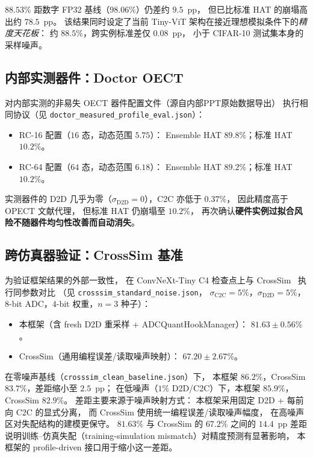 $88.53\%$ 距数字 FP32 基线（$98.06\%$）仍差约 $9.5$~pp，
但已比标准 HAT 的崩塌高出约 $78.5$~pp。
该结果同时设定了当前 Tiny-ViT 架构在接近理想模拟条件下的\emph{精度天花板}：
约 $88.5\%$，跨实例标准差仅 $0.08$~pp，
小于 CIFAR-10 测试集本身的采样噪声。

\subsection{内部实测器件：Doctor OECT}

对内部实测的非易失 OECT 器件配置文件（源自内部PPT原始数据导出）
执行相同协议（见 \texttt{doctor\_measured\_profile\_eval.json}）：
\begin{itemize}
    \item RC-16 配置（$16$ 态，动态范围 $5.75$）：
    Ensemble HAT $89.8\%$；标准 HAT $10.2\%$。
    \item RC-64 配置（$64$ 态，动态范围 $6.18$）：
    Ensemble HAT $89.2\%$；标准 HAT $10.2\%$。
\end{itemize}

实测器件的 D2D 几乎为零（$\sigma_{\mathrm{D2D}}=0$），C2C 亦低于 $0.37\%$，
因此精度高于 OPECT 文献代理，
但标准 HAT 仍崩塌至 $10.2\%$，
再次确认\textbf{硬件实例过拟合风险不随器件均匀性改善而自动消失}。

\subsection{跨仿真器验证：CrossSim 基准}

为验证框架结果的外部一致性，
在 ConvNeXt-Tiny C4 检查点上与 CrossSim~\citep{crosssim2026} 执行同参数对比
（见 \texttt{crosssim\_standard\_noise.json}，
$\sigma_{\mathrm{C2C}}=5\%$，$\sigma_{\mathrm{D2D}}=5\%$，8-bit ADC，4-bit 权重，$n=3$ 种子）：
\begin{itemize}
    \item 本框架（含 fresh D2D 重采样 + ADCQuantHookManager）：
    $\mathbf{81.63\pm0.56\%}$。
    \item CrossSim（通用编程误差/读取噪声映射）：
    $67.20\pm2.67\%$。
\end{itemize}

在零噪声基线（\texttt{crosssim\_clean\_baseline.json}）下，
本框架 $86.2\%$，CrossSim $83.7\%$，差距缩小至 $2.5$~pp；
在低噪声（$1\%$ D2D/C2C）下，本框架 $85.9\%$，CrossSim $82.9\%$。
差距主要来源于噪声映射方式：
本框架采用固定 D2D + 每前向 C2C 的显式分离，
而 CrossSim 使用统一编程误差/读取噪声幅度，
在高噪声区对失配结构的建模更保守。
$81.63\%$ 与 CrossSim 的 $67.2\%$ 之间的 $14.4$~pp 差距
说明训练--仿真失配（training-simulation mismatch）对精度预测有显著影响，
本框架的 profile-driven 接口用于缩小这一差距。


